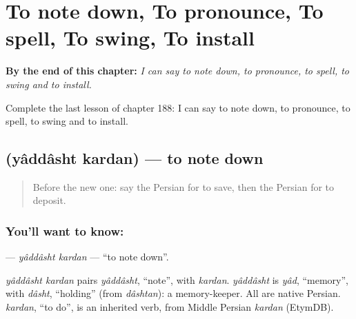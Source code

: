 
\chapter{To note down, To pronounce, To spell, To swing, To install}
\label{ch:fa-to-note-down-to-pronounce-to-spell-to-swing-to-install}

\begin{chapteropening}
\textbf{By the end of this chapter:} \emph{I can say to note down, to pronounce, to spell, to swing and to install.}

Complete the last lesson of chapter 188: I can say to note down, to pronounce, to spell, to swing and to install.
\end{chapteropening}

\section[\texorpdfstring{\fa{یادداشت} \fa{کردن} (yâddâsht kardan)}{یادداشت کردن (yâddâsht kardan)}]{  (yâddâsht kardan) — to note down}

\label{lesson:FA-C188-yaddasht-kardan}



\begin{quote}
Before the new one: say the Persian for to save, then the Persian for to deposit.
\end{quote}

\subsection*{You'll want to know:  }
\textbf{ } — \emph{yâddâsht kardan} — \textquotedblleft{}to note down\textquotedblright{}.

\begin{cousinweb}
\emph{yâddâsht kardan} pairs \emph{yâddâsht}, \textquotedblleft{}note\textquotedblright{}, with \emph{kardan}. \emph{yâddâsht} is \emph{yâd}, \textquotedblleft{}memory\textquotedblright{}, with \emph{dâsht}, \textquotedblleft{}holding\textquotedblright{} (from \emph{dâshtan}): a memory-keeper. All are native Persian. \emph{kardan}, \textquotedblleft{}to do\textquotedblright{}, is an inherited verb, from Middle Persian \emph{kardan} (EtymDB).
\end{cousinweb}

